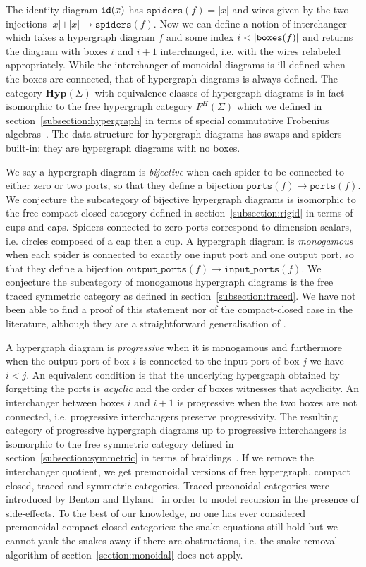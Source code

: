 The identity diagram $\mathtt{id}(x)$ has $\mathtt{spiders}(f) = \vert x \vert$ and wires given by the two injections $\vert x \vert + \vert x \vert \to \mathtt{spiders}(f)$.
Now we can define a notion of interchanger which takes a hypergraph diagram $f$ and some index $i < \vert \mathtt{boxes}(f) \vert$ and returns the diagram with boxes $i$ and $i + 1$ interchanged, i.e. with the wires relabeled appropriately.
While the interchanger of monoidal diagrams is ill-defined when the boxes are connected, that of hypergraph diagrams is always defined.
The category $\mathbf{Hyp}(\Sigma)$ with equivalence classes of hypergraph diagrams is in fact isomorphic to the free hypergraph category $F^H(\Sigma)$ which we defined in section~\ref{subsection:hypergraph} in terms of special commutative Frobenius algebras~\cite[Theorem 3.3]{BonchiEtAl16}.
The data structure for hypergraph diagrams has swaps and spiders built-in: they are hypergraph diagrams with no boxes.

We say a hypergraph diagram is \emph{bijective} when each spider to be connected to either zero or two ports, so that they define a bijection $\mathtt{ports}(f) \to \mathtt{ports}(f)$.
We conjecture the subcategory of bijective hypergraph diagrams is isomorphic to the free compact-closed category defined in section~\ref{subsection:rigid} in terms of cups and caps.
Spiders connected to zero ports correspond to dimension scalars, i.e. circles composed of a cap then a cup.
A hypergraph diagram is \emph{monogamous} when each spider is connected to exactly one input port and one output port, so that they define a bijection $\mathtt{output\_ports}(f) \to \mathtt{input\_ports}(f)$.
We conjecture the subcategory of monogamous hypergraph diagrams is the free traced symmetric category as defined in section~\ref{subsection:traced}.
We have not been able to find a proof of this statement nor of the compact-closed case in the literature, although they are a straightforward generalisation of \cite[Theorem 3.3]{BonchiEtAl16}.

A hypergraph diagram is \emph{progressive} when it is monogamous and furthermore when the output port of box $i$ is connected to the input port of box $j$ we have $i < j$.
An equivalent condition is that the underlying hypergraph obtained by forgetting the ports is \emph{acyclic} and the order of boxes witnesses that acyclicity.
An interchanger between boxes $i$ and $i + 1$ is progressive when the two boxes are not connected, i.e. progressive interchangers preserve progressivity.
The resulting category of progressive hypergraph diagrams up to progressive interchangers is isomorphic to the free symmetric category defined in section~\ref{subsection:symmetric} in terms of braidings~\cite[Theorem~3.12]{BonchiEtAl16}.
If we remove the interchanger quotient, we get premonoidal versions of free hypergraph, compact closed, traced and symmetric categories.
Traced preonoidal categories were introduced by Benton and Hyland~\cite{BentonHyland03} in order to model recursion in the presence of side-effects.
To the best of our knowledge, no one has ever considered premonoidal compact closed categories: the snake equations still hold but we cannot yank the snakes away if there are obstructions, i.e. the snake removal algorithm of section~\ref{section:monoidal} does not apply.

